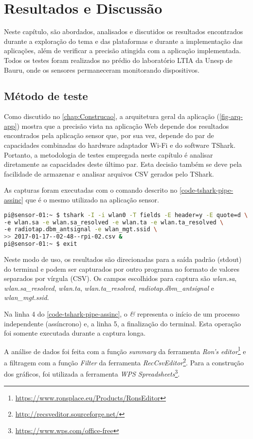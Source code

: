 \chapter{Resultados e Discussão}
\label{chap:resultados}

Neste capítulo, são abordados, analisados e discutidos os resultados encontrados
durante a exploração do tema e das plataformas e durante a implementação das
aplicações, além de verificar a precisão atingida com a aplicação implementada. Todos os testes foram realizados no prédio do laboratório
LTIA da Unesp de Bauru, onde os sensores permaneceram monitorando dispositivos.



\section{Método de teste}
\label{sec:metodo-teste}

Como discutido no \autoref{chap:Construcao}, a arquitetura geral da aplicação (\autoref{fig-arq-app})
mostra que a precisão vista na aplicação Web depende dos resultados
encontrados pela aplicação sensor que, por sua vez, depende do par de
capacidades combinadas do hardware adaptador Wi-Fi e do software
TShark. Portanto, a metodologia de testes empregada neste capítulo é
analisar diretamente as capacidades deste último par. Esta decisão também se
deve pela facilidade de armazenar e analisar arquivos CSV gerados pelo
TShark.

As capturas foram executadas com o comando descrito no \autoref{code-tshark-pipe-assinc}
que é o mesmo utilizado na aplicação sensor.

\begin{lstlisting}[language=bash,caption={TShark e redirecionamento da saída para arquivo assíncrono},label=code-tshark-pipe-assinc]
pi@sensor-01:~ $ tshark -I -i wlan0 -T fields -E header=y -E quote=d \
-e wlan.sa -e wlan.sa_resolved -e wlan.ta -e wlan.ta_resolved \
-e radiotap.dbm_antsignal -e wlan_mgt.ssid \
>> 2017-01-17--02-48--rpi-02.csv &
pi@sensor-01:~ $ exit
\end{lstlisting}

Neste modo de uso, os resultados são direcionadas para a saída padrão
(stdout)  do terminal e podem ser capturados por outro programa no formato
de valores separados por vírgula (CSV). Os campos escolhidos para captura
são \emph{wlan.sa}, \emph{wlan.sa\_resolved}, \emph{wlan.ta},
\emph{wlan.ta\_resolved}, \emph{radiotap.dbm\_antsignal} e \emph{wlan\_mgt.ssid}.

Na linha 4 do \autoref{code-tshark-pipe-assinc}, o \emph{\&} representa o início
de um processo independente (assíncrono) e, a linha 5, a finalização do terminal.
Esta operação foi somente executada durante a captura longa.

A análise de dados foi feita com a função \emph{summary} da ferramenta
\emph{Ron’s editor}\footnote{\url{https://www.ronsplace.eu/Products/RonsEditor}}
e a filtragem com a função \emph{Filter} da ferramenta
\emph{RecCsvEditor}\footnote{\url{http://recsveditor.sourceforge.net/}}. Para a
construção dos gráficos, foi utilizada a ferramenta
\emph{WPS Spreadsheets}\footnote{\url{https://www.wps.com/office-free}}.
